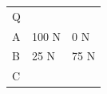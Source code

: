 \begin{enumerate}[noitemsep, label=\textbf{\arabic*}. ]
{\begin{center}
\begin{xtabular*}{\mytablewidth}[t]{|p{10\mystarwidth}|p{10\mystarwidth}|p{10\mystarwidth}|}
        Q%
     \tabularnewline{}
    
    
        A &
    
    
        100 N &
    
    
        0 N%
     \tabularnewline{}
    
    
        B &
    
    
        25 N &
    
    
        75 N%
     \tabularnewline{}
    
    
        C &
    

\end{xtabular*}
\end{center}}
\end{enumerate}
